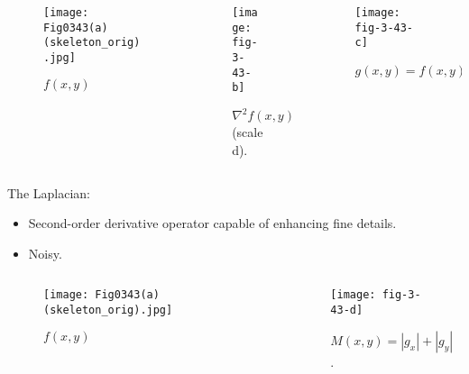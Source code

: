 \begin{frame}
\begin{columns}
\begin{column}{.3\textwidth}
\begin{figure}
\centering
\texttt{[image: Fig0343(a)(skeleton\_orig).jpg]}
\caption{$f(x,y)$}
\end{figure}
\end{column}
\begin{column}{.3\textwidth}
\begin{figure}
\centering
\texttt{[image: fig-3-43-b]}
\caption{$\nabla^{2} f(x,y)$ (scaled).}
\end{figure}
\end{column}
\begin{column}{.3\textwidth}
\begin{figure}
\centering
\texttt{[image: fig-3-43-c]}
\caption{$g(x,y) = f(x,y) - c\nabla^{2} f(x,y)$}
\end{figure}
\end{column}
\end{columns}
\end{frame}


\begin{frame}
The Laplacian:
\begin{itemize}
\item Second-order derivative operator capable of enhancing fine details.
\item Noisy.
\end{itemize}
\end{frame}


\begin{frame}
\begin{columns}
\begin{column}{.5\textwidth}
\begin{figure}
\centering
\texttt{[image: Fig0343(a)(skeleton\_orig).jpg]}
\caption{$f(x,y)$}
\end{figure}
\end{column}
\begin{column}{.5\textwidth}
\begin{figure}
\centering
\texttt{[image: fig-3-43-d]}
\caption{$M(x,y) = |g_{x}| + |g_{y}|$.}
\end{figure}
\end{column}
\end{columns}
\end{frame}

